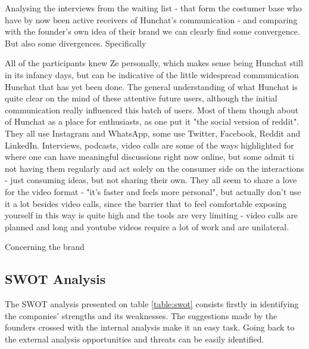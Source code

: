 \documentclass[12pt]{article}
\begin{document}
Analysing the interviews from the waiting list - that form the costumer base who have by now been active receivers of Hunchat's communication - and comparing with the founder's own idea of their brand we can clearly find some convergence. %
But also some divergences. Specifically

All of the participants knew Ze personally, which makes sense being Hunchat still in its infancy days, but can be indicative of the little widespread communication Hunchat that has yet been done. The general understanding of what Hunchat is quite clear on the mind of these attentive future users, although the initial communication really influenced this batch of users. Most of them though about of Hunchat as a place for enthusiasts, as one put it "the social version of reddit". They all use Instagram and WhatsApp, some use Twitter, Facebook, Reddit and LinkedIn.  Interviews, podcasts, video calls are some of the ways highlighted for where one can have meaningful discussions right now online, but some admit ti not having them regularly and act solely on the consumer side on the interactions - just consuming ideas, but not sharing their own. They all seem to share a love for the video format - "it's faster and feels more personal", but actually don't use it a lot besides video calls, since the barrier that  to feel comfortable exposing yourself in this way is quite high and the tools are very limiting - video calls are planned and long and youtube videos require a lot of work and are unilateral.

 Concerning the brand 

\subsection{SWOT Analysis}
The SWOT analysis presented on table \ref{table:swot} consists firstly in identifying the companies' strengths and its weaknesses. The suggestions made by the founders crossed with the internal analysis make it an easy task. Going back to the external analysis opportunities and threats can be easily identified. 
\end{document}
